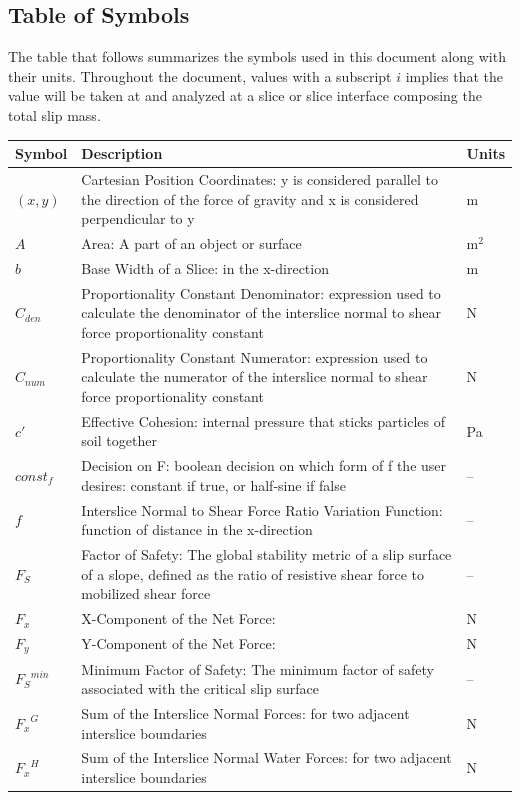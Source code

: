 \documentclass[12pt]{article}
\begin{document}
\subsection{Table of Symbols}
\label{Sec:ToS}
The table that follows summarizes the symbols used in this document along with their units. Throughout the document, values with a subscript $i$ implies that the value will be taken at and analyzed at a slice or slice interface composing the total slip mass.
\begin{longtabu}{l X[l] l}
\toprule
Symbol & Description & Units
\\
\midrule
\endhead
$(x,y)$ & Cartesian Position Coordinates: y is considered parallel to the direction of the force of gravity and x is considered perpendicular to y & m
\\
$A$ & Area: A part of an object or surface & $\text{m}^{2}$
\\
$b$ & Base Width of a Slice: in the x-direction & m
\\
${C_{den}}$ & Proportionality Constant Denominator: expression used to calculate the denominator of the interslice normal to shear force proportionality constant & N
\\
${C_{num}}$ & Proportionality Constant Numerator: expression used to calculate the numerator of the interslice normal to shear force proportionality constant & N
\\
$c'$ & Effective Cohesion: internal pressure that sticks particles of soil together & Pa
\\
$const_f$ & Decision on F: boolean decision on which form of f the user desires: constant if true, or half-sine if false & --
\\
$f$ & Interslice Normal to Shear Force Ratio Variation Function: function of distance in the x-direction & --
\\
${F_{S}}$ & Factor of Safety: The global stability metric of a slip surface of a slope, defined as the ratio of resistive shear force to mobilized shear force & --
\\
${F_{x}}$ & X-Component of the Net Force:  & N
\\
${F_{y}}$ & Y-Component of the Net Force:  & N
\\
${{F_{S}}^{min}}$ & Minimum Factor of Safety: The minimum factor of safety associated with the critical slip surface & --
\\
${{F_{x}}^{G}}$ & Sum of the Interslice Normal Forces: for two adjacent interslice boundaries & N
\\
${{F_{x}}^{H}}$ & Sum of the Interslice Normal Water Forces: for two adjacent interslice boundaries & N

\end{longtabu}
\end{document}
